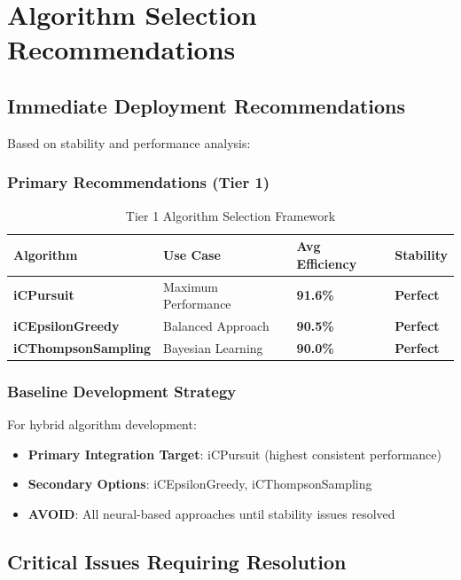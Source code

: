\documentclass[12pt,a4paper]{article}
\newcommand{\success}[1]{\textcolor{successcolor}{\textbf{#1}}}
\begin{document}
\section{Algorithm Selection Recommendations}

\subsection{Immediate Deployment Recommendations}

Based on stability and performance analysis:

\subsubsection{Primary Recommendations (Tier 1)}

\begin{table}[H]
\centering
\caption{Tier 1 Algorithm Selection Framework}
\begin{tabular}{|l|l|l|l|}
\hline
\textbf{Algorithm} & \textbf{Use Case} & \textbf{Avg Efficiency} & \textbf{Stability} \\
\hline
\hline
\success{iCPursuit} & Maximum Performance & \success{91.6\%} & \success{Perfect} \\
\success{iCEpsilonGreedy} & Balanced Approach & \success{90.5\%} & \success{Perfect} \\
\success{iCThompsonSampling} & Bayesian Learning & \success{90.0\%} & \success{Perfect} \\
\hline
\end{tabular}
\end{table}

\subsubsection{Baseline Development Strategy}

For hybrid algorithm development:
\begin{itemize}
\item \textbf{Primary Integration Target}: iCPursuit (highest consistent performance)
\item \textbf{Secondary Options}: iCEpsilonGreedy, iCThompsonSampling
\item \textbf{AVOID}: All neural-based approaches until stability issues resolved
\end{itemize}

\subsection{Critical Issues Requiring Resolution}
\end{document}
